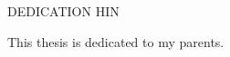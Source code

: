 \newpage
{}

\begin{center}
DEDICATION
HIN\end{center}

\begin{center}
This thesis is dedicated to my parents.
\end{center}
